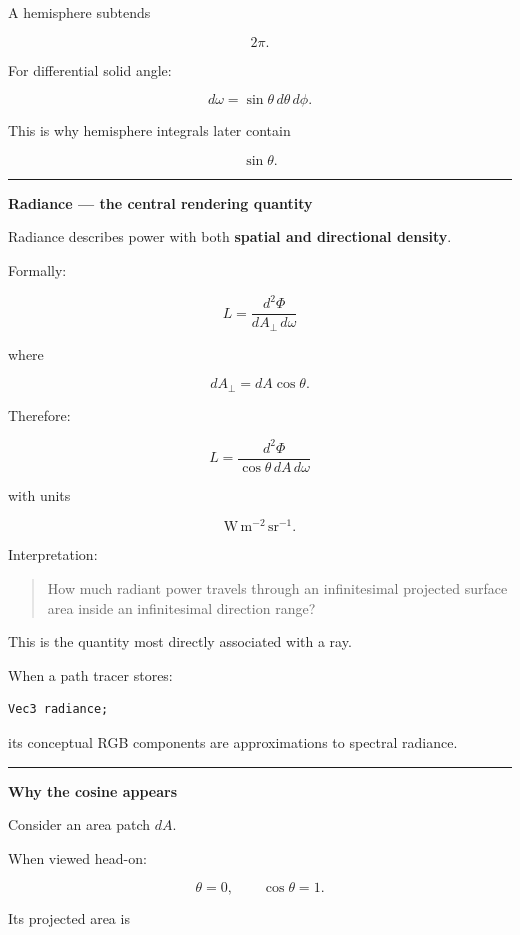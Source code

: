 A hemisphere subtends

\[
2\pi.
\]

For differential solid angle:

\[
d\omega
=
\sin\theta\,d\theta\,d\phi.
\]

This is why hemisphere integrals later contain

\[
\sin\theta.
\]

\begin{center}\rule{0.5\linewidth}{0.5pt}\end{center}

\textbf{Radiance --- the central rendering quantity}

Radiance describes power with both \textbf{spatial and directional density}.

Formally:

\[
\boxed{
L=
\frac{d^2\Phi}
{dA_\perp\,d\omega}
}
\]

where

\[
dA_\perp
=
dA\cos\theta.
\]

Therefore:

\[
\boxed{
L=
\frac{d^2\Phi}
{\cos\theta\,dA\,d\omega}
}
\]

with units

\[
\mathrm{W\,m^{-2}\,sr^{-1}}.
\]

Interpretation:

\begin{quote}
How much radiant power travels through an infinitesimal projected surface area inside an infinitesimal direction range?
\end{quote}

This is the quantity most directly associated with a ray.

When a path tracer stores:

\begin{verbatim}
Vec3 radiance;
\end{verbatim}

its conceptual RGB components are approximations to spectral radiance.

\begin{center}\rule{0.5\linewidth}{0.5pt}\end{center}

\textbf{Why the cosine appears}

Consider an area patch \(dA\).

When viewed head-on:

\[
\theta=0,\qquad\cos\theta=1.
\]

Its projected area is

